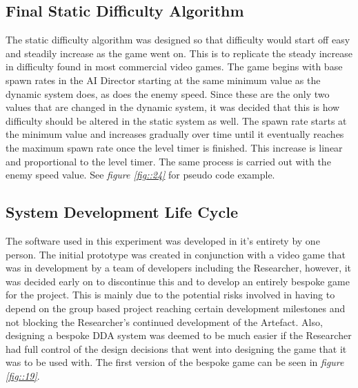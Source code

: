 \documentclass[journal]{IEEEtran}
\begin{document}
\subsection{Final Static Difficulty Algorithm}
The static difficulty algorithm was designed so that difficulty would start off easy and steadily increase as the game went on. This is to replicate the steady increase in difficulty found in most commercial video games. The game begins with base spawn rates in the AI Director starting at the same minimum value as the dynamic system does, as does the enemy speed. Since these are the only two values that are changed in the dynamic system, it was decided that this is how difficulty should be altered in the static system as well. The spawn rate starts at the minimum value and increases gradually over time until it eventually reaches the maximum spawn rate once the level timer is finished. This increase is linear and proportional to the level timer. The same process is carried out with the enemy speed value. See \textit{figure \ref{fig::24}} for pseudo code example. 


\subsection{System Development Life Cycle}

The software used in this experiment was developed in it's entirety by one person. The initial prototype was created in conjunction with a video game that was in development by a team of developers including the Researcher, however, it was decided early on to discontinue this and to develop an entirely bespoke game for the project. This is mainly due to the potential risks involved in having to depend on the group based project reaching certain development milestones and not blocking the Researcher's continued development of the Artefact. Also, designing a bespoke DDA system was deemed to be much easier if the Researcher had full control of the design decisions that went into designing the game that it was to be used with. The first version of the bespoke game can be seen in \textit{figure \ref{fig::19}}.
\end{document}
